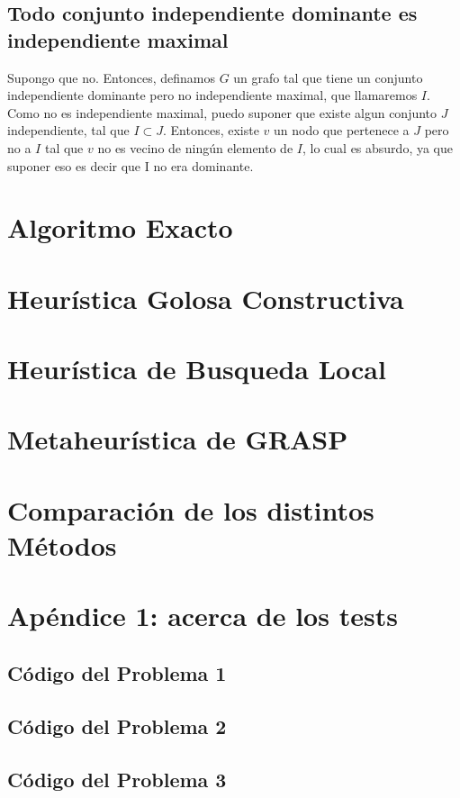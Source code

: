 \documentclass[a4paper]{article}
\begin{document}
\subsection{ Todo conjunto independiente dominante es independiente maximal}

Supongo que no. Entonces, definamos $G$ un grafo tal que tiene un conjunto independiente dominante pero no independiente maximal, que llamaremos $I$. Como no es independiente maximal, puedo suponer que existe algun conjunto $J$ independiente, tal que $I \subset J$. Entonces, existe $v$ un nodo que pertenece a $J$ pero no a $I$ tal que $v$ no es vecino de ningún elemento de $I$, lo cual es absurdo, ya que suponer eso es decir que I no era dominante. 

\section{Algoritmo Exacto}


\newpage
\section{Heurística Golosa Constructiva}


\newpage
\section{Heurística de Busqueda Local}


\newpage
\section{Metaheurística de GRASP}


\newpage
\section{Comparación de los distintos Métodos}


\newpage
\section{Apéndice 1: acerca de los tests}


\subsection{Código del Problema 1}

\subsection{Código del Problema 2}



\subsection{Código del Problema 3}
\end{document}
